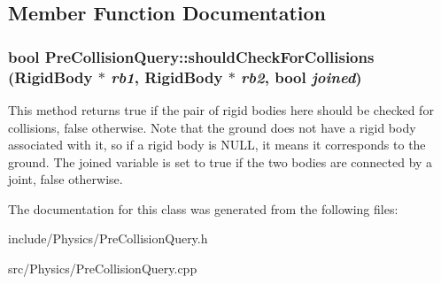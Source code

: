 \subsection{Member Function Documentation}
\hypertarget{classCartWheel_1_1Physics_1_1PreCollisionQuery_ab0d4931b667c1d88967e16288c9d53bf}{
\subsubsection[{shouldCheckForCollisions}]{\setlength{\rightskip}{0pt plus 5cm}bool PreCollisionQuery::shouldCheckForCollisions ({\bf RigidBody} $\ast$ {\em rb1}, \/  {\bf RigidBody} $\ast$ {\em rb2}, \/  bool {\em joined})}}
\label{classCartWheel_1_1Physics_1_1PreCollisionQuery_ab0d4931b667c1d88967e16288c9d53bf}
This method returns true if the pair of rigid bodies here should be checked for collisions, false otherwise. Note that the ground does not have a rigid body associated with it, so if a rigid body is NULL, it means it corresponds to the ground. The joined variable is set to true if the two bodies are connected by a joint, false otherwise. 

The documentation for this class was generated from the following files:\begin{DoxyCompactItemize}
\item 
include/Physics/PreCollisionQuery.h\item 
src/Physics/PreCollisionQuery.cpp\end{DoxyCompactItemize}

